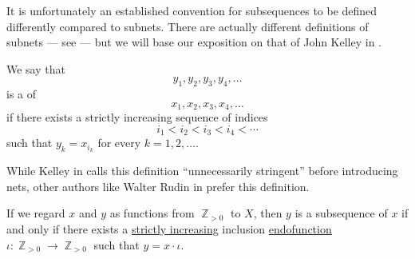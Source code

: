 It is unfortunately an established convention for subsequences to be defined differently compared to subnets. There are actually different definitions of subnets --- see \cite{Lehuta2009} --- but we will base our exposition on that of John Kelley in \cite[ch. 2]{Kelley1975}.

\begin{definition}\label{def:subsequence}
  We say that
  \begin{equation}\label{eq:def:subsequence/sub}
    y_1, y_2, y_3, y_4, \ldots
  \end{equation}
  is a  of
  \begin{equation}\label{eq:def:subsequence/original}
    x_1, x_2, x_3, x_4, \ldots
  \end{equation}
  if there exists a strictly increasing sequence of indices
  \begin{equation*}
    i_1 < i_2 < i_3 < i_4 < \cdots
  \end{equation*}
  such that \( y_k = x_{i_k} \) for every \( k = 1, 2, \ldots \).
\end{definition}
\begin{comments}
  \item While Kelley in \cite[63]{Kelley1975} calls this definition \enquote{unnecessarily stringent} before introducing nets, other authors like Walter Rudin in \cite[def. 3.5]{Rudin1976Principles} prefer this definition.

  \item If we regard \( x \) and \( y \) as functions from \( \BbbZ_{>0} \) to \( X \), then \( y \) is a subsequence of \( x \) if and only if there exists a \hyperref[def:order_homomorphism/increasing]{strictly increasing} inclusion \hyperref[def:function/endofunction]{endofunction} \( \iota: \BbbZ_{>0} \to \BbbZ_{>0} \) such that \( y = x \cdot \iota \).
\end{comments}

